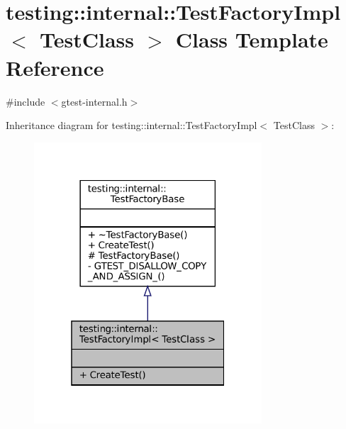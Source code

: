 \hypertarget{classtesting_1_1internal_1_1TestFactoryImpl}{}\section{testing\+:\+:internal\+:\+:Test\+Factory\+Impl$<$ Test\+Class $>$ Class Template Reference}
\label{classtesting_1_1internal_1_1TestFactoryImpl}


{\ttfamily \#include $<$gtest-\/internal.\+h$>$}



Inheritance diagram for testing\+:\+:internal\+:\+:Test\+Factory\+Impl$<$ Test\+Class $>$\+:
\nopagebreak
\begin{figure}[H]
\begin{center}
\leavevmode
\includegraphics[width=241pt]{classtesting_1_1internal_1_1TestFactoryImpl__inherit__graph}
\end{center}
\end{figure}


